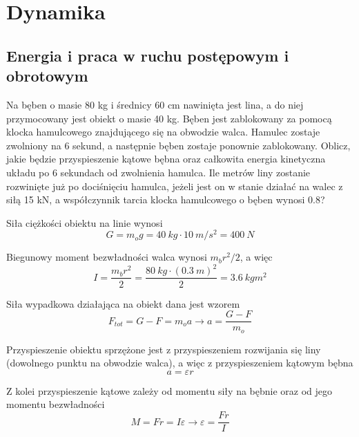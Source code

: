 \section*{Dynamika}

    \subsection*{Energia i praca w ruchu postępowym i obrotowym}
    
    Na bęben o masie 80 kg i średnicy 60 cm nawinięta jest lina, a do niej przymocowany jest obiekt o masie 40 kg. Bęben jest zablokowany za pomocą klocka hamulcowego znajdującego się na obwodzie walca. Hamulec zostaje zwolniony na 6 sekund, a następnie bęben zostaje ponownie zablokowany. Oblicz, jakie będzie przyspieszenie kątowe bębna oraz całkowita energia kinetyczna układu po 6 sekundach od zwolnienia hamulca. Ile metrów liny zostanie rozwinięte już po dociśnięciu hamulca, jeżeli jest on w stanie działać na walec z siłą 15 kN, a współczynnik tarcia klocka hamulcowego o bęben wynosi 0.8?
    
    Siła ciężkości obiektu na linie wynosi
    \begin{equation}
        G = m_o g = \SI{40}{kg} \cdot \SI{10}{m/s^2} = \SI{400}{N} 
    \end{equation}{}
    
    Biegunowy moment bezwładności walca wynosi $m_b r^2/2$, a więc
    \begin{equation}
        I = \frac{m_b r^2}{2} = \frac{\SI{80}{kg} \cdot (\SI{0.3}{m})^2}{2} = \SI{3.6}{kgm^2}
    \end{equation}{}
    
    Siła wypadkowa działająca na obiekt dana jest wzorem
    \begin{equation}
        F_{tot} = G-F = m_o a \xrightarrow{}  a = \frac{G-F}{m_o}
    \end{equation}{}
    
    Przyspieszenie obiektu sprzężone jest z przyspieszeniem rozwijania się liny (dowolnego punktu na obwodzie walca), a więc z przyspieszeniem kątowym bębna
    \begin{equation}
        a = \varepsilon r
    \end{equation}{}
    
    Z kolei przyspieszenie kątowe zależy od momentu siły na bębnie oraz od jego momentu bezwładności
    \begin{equation}
        M = Fr = I \varepsilon \xrightarrow{} \varepsilon = \frac{Fr}{I}
    \end{equation}{}
    
